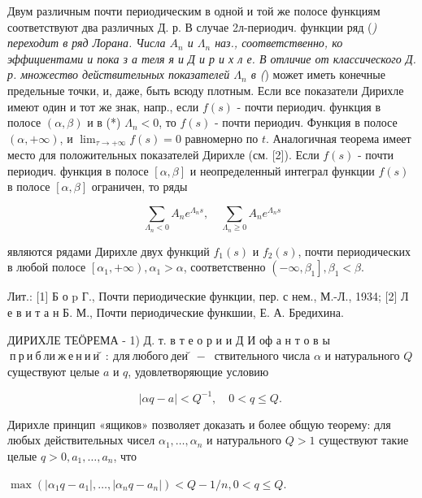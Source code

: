 \documentclass[10pt]{article}
\begin{document}
Двум различным почти периодическим в одной и той же полосе функциям соответствуют два различных Д. р. В случае 2л-периодич. функции ряд (\textit{) переходит в ряд Лорана. Числа $A_{n}$ и $\Lambda_{n}$ наз., соответственно, ко эффициентами и пока з а теля я и Д и р и х л е. В отличие от классического Д. р. множество действительных показателей $\Lambda_{n}$ в (}) может иметь конечные предельные точки, и, даже, быть всюду плотным. Если все показатели Дирихле имеют один и тот же знак, напр., если $f(s)$ - почти периодич. функция в полосе $(\alpha, \beta)$ и в (*) $\Lambda_{n}<0$, то $f(s)$ - почти периодич. Функция в полосе $(\alpha,+\infty)$, и $\lim _{\tau \rightarrow+\infty} f(s)=0$ равномерно по $t$. Аналогичная теорема имеет место для положительных показателей Дирихле (см. [2]). Если $f(s)$ - почти периодич. функция в полосе $[\alpha, \beta]$ и неопределенный интеграл функции $f(s)$ в полосе $[\alpha, \beta]$ ограничен, то ряды



\[

\sum_{\Lambda_{n}<0} A_{n} e^{\Lambda_{n} s}, \quad \sum_{\Lambda_{n} \geqslant 0} A_{n} e^{\Lambda_{n} s}

\]



являются рядами Дирихле двух функций $f_{1}(s)$ и $f_{2}(s)$, почти периодических в любой полосе $\left[\alpha_{1},+\infty\right), \alpha_{1}>\alpha$, соответственно $\left(-\infty, \beta_{1}\right], \beta_{1}<\beta$.



Лит.: [1] Б о p Г., Почти периодические функции, пер. с нем., М.-Л., 1934; [2] Л е в и т а н Б. М., Почти периодические функшии, Е. А. Бредихина.



ДИРИХЛЕ ТЕӦРЕМА - 1) Д. т. в т е о р и и Д И оф а н т о в ы $\mathbf{~ п ~ р ~ и ~ б ~ л и ~ ж ~ е ~ н ~ и ~ и ̆ : ~ д л я ~ л ю б о г о ~ д е и ̆ - ~}$ ствительного числа $\alpha$ и натурального $Q$ существуют целые $a$ и $q$, удовлетворяющие условию



\[

|\alpha q-a|<Q^{-1}, \quad 0<q \leqslant Q \text {. }

\]



Дирихле принцип «ящиков» позволяет доказать и более общую теорему: для любых действительных чисел $\alpha_{1}, \ldots, \alpha_{n}$ и натурального $Q>1$ существуют такие целые $q>0, a_{1}, \ldots, a_{n}$, что



$\max \left(\left|\alpha_{1} q-a_{1}\right|, \ldots,\left|\alpha_{n} q-a_{n}\right|\right)<Q-1 / n, 0<q \leqslant Q$.
\end{document}
